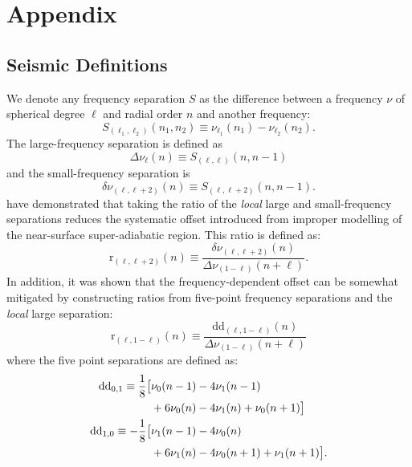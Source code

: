 %
%









\section{Appendix}


\subsection{Seismic Definitions} 
\label{sec:sdefs}
We denote any frequency separation $S$ as the difference between a frequency $\nu$ of spherical degree $\ell$ and radial order $n$ and another frequency: 
\begin{equation} 
  S_{(\ell_1, \ell_2)}(n_1, n_2) \equiv \nu_{\ell_1}(n_1) - \nu_{\ell_2}(n_2).
\end{equation}
The large-frequency separation is defined as
\begin{equation} 
  \Delta\nu_\ell(n) \equiv S_{(\ell, \ell)}(n, n-1)
\end{equation}
and the small-frequency separation is
\begin{equation}
  \delta\nu_{(\ell, \ell+2)}(n) \equiv S_{(\ell, \ell+2)}(n, n-1).
\end{equation}
\citet{2003A&A...411..215R} have demonstrated that taking the ratio of the \emph{local} large and small-frequency separations reduces the systematic offset introduced from improper modelling of the near-surface super-adiabatic region. This ratio is defined as: 
\begin{equation}    %
  \mathrm{r}_{(\ell,\ell +2)}(n) \equiv \frac{\delta\nu_{(\ell, \ell+2)}(n)}{\Delta\nu_{(1-\ell)}(n+\ell)}.
\end{equation}
In addition, it was shown that the frequency-dependent offset can be somewhat mitigated by constructing ratios from five-point frequency separations and the \emph{local} large separation:
\begin{equation} 
  \mathrm{r}_{(\ell, 1-\ell)}(n) \equiv \frac{\mathrm{dd}_{(\ell,1-\ell)}(n)}{\Delta\nu_{(1-\ell)}(n+\ell)} %
\end{equation}
where the five point separations are defined as:
\begin{align} 
  \mathrm{dd}_{0,1} \equiv \frac{1}{8} \big[&\nu_0(n-1) - 4\nu_1(n-1) \notag\\
                                 &+6\nu_0(n) - 4\nu_1(n) + \nu_0(n+1)\big]\\ 
  \mathrm{dd}_{1,0} \equiv -\frac{1}{8} \big[&\nu_1(n-1) - 4\nu_0(n) \notag\\
                                &+6\nu_1(n) - 4\nu_0(n+1) + \nu_1(n+1)\big]. \label{eqn:dlast}
\end{align}
